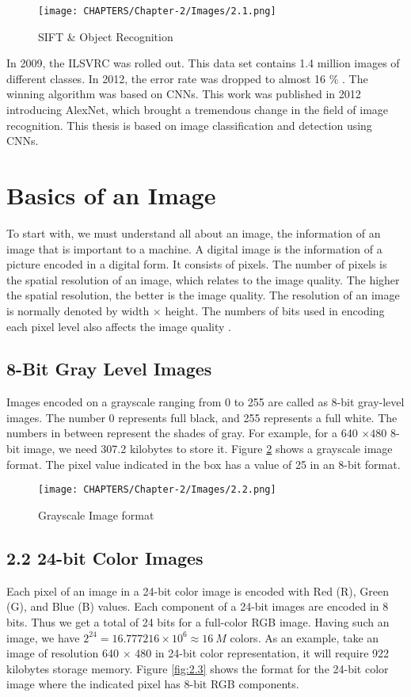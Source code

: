 \begin{figure}[t]
    \centering
    \texttt{[image: CHAPTERS/Chapter-2/Images/2.1.png]}
    \caption{SIFT \& Object Recognition}
    \label{fig:2.1}
\end{figure}
In 2009, the ILSVRC was 
rolled out. This data set contains 1.4 million images of different classes. In 2012, the 
error rate was dropped to almost 16 \% \cite{chap_2_article:5}. The winning algorithm was based on 
CNNs. This work was published in 2012 introducing AlexNet, which brought a tremendous change in the field of image recognition. This thesis is based on image 
classification and detection using CNNs. 

\section{Basics of an Image}
To start with, we must understand all about an image, the information of an image that is important to a machine. A digital image is the information of a picture encoded in a digital form. It consists of pixels. The number of pixels is the spatial resolution of an image, which relates to the image quality. The higher the spatial resolution, the better is the image quality. The resolution of an image is normally denoted by width $\times$ height. 
The numbers of bits used in encoding each pixel level also affects the image quality \cite{chap_2_article:6,chap_2_article:7}. 

\subsection{8-Bit Gray Level Images}
Images encoded on a grayscale ranging from 0 to 255 are called as
8-bit gray-level images. The number 0 represents full black, and 255 represents a full white. The numbers in between represent the shades of gray. For example, for a 640 $\times 480$ 8-bit 
image, we need 307.2 kilobytes to store it. Figure \ref{fig:2.2} shows a 
grayscale image format. The pixel value indicated in the box has a value of 25 in an 8-bit format. 

\begin{figure}[H]
    \centering
    \texttt{[image: CHAPTERS/Chapter-2/Images/2.2.png]}
    \caption{Grayscale Image format}
    \label{fig:2.2}
\end{figure}

\subsection{2.2 24-bit Color Images}
Each pixel of an image in a 24-bit color image is encoded with Red (R), Green (G), and Blue (B) values. Each component of a 24-bit
images are encoded in 8 bits. Thus we get a total of 24 bits for a
full-color RGB image. Having 
such an image, we have $2^{24} = 16.777216 \times 10^{6} \approx 16\:M$ colors.
As an example, take an image of resolution 640 $\times$ 480 in 24-bit color 
representation, it will require 922 kilobytes storage memory.
Figure \ref{fig:2.3} shows the format for the 24-bit 
color image where the indicated pixel has 8-bit RGB components.

